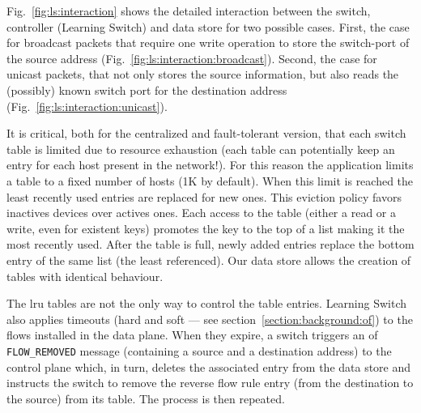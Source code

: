 Fig.~\ref{fig:ls:interaction}  shows the detailed interaction between the switch, controller (Learning Switch) and data store for two possible cases. 
First, the case for broadcast packets that require one write operation to store the switch-port  of the source address (Fig.~\ref{fig:ls:interaction:broadcast}). 
Second,  the case for unicast packets, that not only stores the source information, but also reads the (possibly) known switch port  for the destination address (Fig.~\ref{fig:ls:interaction:unicast}). 


It is critical, both for the centralized and fault-tolerant version, that each switch table is limited due to resource exhaustion (each table can potentially keep an entry for each host present in the network!).
For this reason the application limits a table to a fixed number of hosts (1K by default).
When this limit is reached the least recently used entries are replaced for new ones.  
This eviction policy favors inactives devices over actives ones.
Each access to the table (either a read or a write, even for existent keys) promotes the key to the top of a list making it the most recently used.
After the table is full, newly added entries replace the bottom entry of the same list (the least referenced). Our data store allows the creation of tables with identical behaviour. 

The \gls{lru} tables are not the only way to control the table entries. Learning Switch also applies timeouts (hard and soft --- see section~\ref{section:background:of})  to the flows installed in the data plane. When they expire, a switch triggers an \gls{of} \texttt{FLOW\_REMOVED} message (containing a source and a destination address) to the control plane which, in turn, deletes the associated entry from the data store and instructs the switch to remove the reverse flow rule entry (from the destination to the source) from its table. The process is then repeated. 

